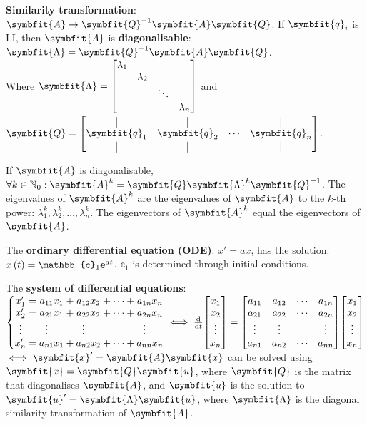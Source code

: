 \documentclass{article}
\begin{document}
\noindent \textbf{Similarity transformation}: $\symbfit{A}\rightarrow \symbfit{Q}^{-1}\symbfit{A}\symbfit{Q}$. If $\symbfit{q}_i$ is LI, then $\symbfit{A}$ is \textbf{diagonalisable}: $\symbfit{\Lambda}=\symbfit{Q}^{-1}\symbfit{A}\symbfit{Q}$. \\
Where $\symbfit{\Lambda}=\mqty[\dmat{\lambda_1, \lambda_2, \ddots, \lambda_n}]$ and $\symbfit{Q}=\mqty[\vertbar & \vertbar & & \vertbar \\ \symbfit{q}_1 & \symbfit{q}_2 & \cdots & \symbfit{q}_n \\ \vertbar & \vertbar & & \vertbar]$.

\noindent If $\symbfit{A}$ is diagonalisable, $\forall k \in \mathbb{N}_0:\symbfit{A}^k = \symbfit{Q} \symbfit{\Lambda}^k \symbfit{Q}^{-1}$. The eigenvalues of $\symbfit{A}^k$ are the eigenvalues of $\symbfit{A}$ to the $k$-th power: $\lambda_1^k, \lambda_2^k, \dots, \lambda_n^k$. The eigenvectors of $\symbfit{A}^k$ equal the eigenvectors of $\symbfit{A}$.

\noindent The \textbf{ordinary differential equation (ODE)}: $x' = a x$, has the solution: $\func{x}{t} = \mathbb{c}_1 \e^{a t}$. $\mathbb{c}_1$ is determined through initial conditions.

\noindent The \textbf{system of differential equations}: $
\left\{
	\setlength\arraycolsep{0pt}
	\begin{array}{ c >{{}}c<{{}} c >{{}}c<{{}} c >{{}}c<{{}} c >{{}}c<{{}} c  }
	x'_1               &=& a_{11}x_1                         &+& a_{12}x_2                         &+& \cdots &+& a_{1n}x_n \\
	x'_2               &=& a_{21}x_1                         &+& a_{22}x_2                         &+& \cdots &+& a_{2n}x_n \\
	\vdotswithin{x'_3} & & \vdotswithin{a_{31}}\phantom{x_1} & & \vdotswithin{a_{32}}\phantom{x_2} & &        & & \vdotswithin{a_{3n}}\phantom{x_n} \\ 
	x'_n               &=& a_{n1}x_1                         &+& a_{n2}x_2                         &+& \cdots &+& a_{nn}x_n 
	\end{array}
\right. \iff 
\dv{t}\mqty[x_1 \\ x_2 \\ \vdots \\ x_n] = \mqty[
	a_{11} & a_{12} & \cdots & a_{1n} \\
	a_{21} & a_{22} & \cdots & a_{2n} \\
	\vdots & \vdots &        & \vdots \\
	a_{n1} & a_{n2} & \cdots & a_{nn}
] \mqty[x_1 \\ x_2 \\ \vdots \\ x_n]$ $\iff \symbfit{x}' = \symbfit{A} \symbfit{x}$ can be solved using $\symbfit{x}=\symbfit{Q}\symbfit{u}$, where $\symbfit{Q}$ is the matrix that diagonalises $\symbfit{A}$, and $\symbfit{u}$ is the solution to $\symbfit{u}' = \symbfit{\Lambda} \symbfit{u}$, where $\symbfit{\Lambda}$ is the diagonal similarity transformation of $\symbfit{A}$.
\end{document}

